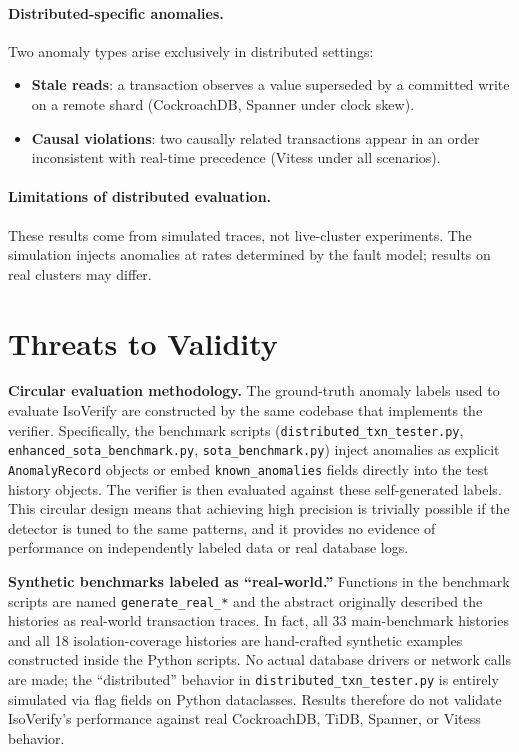 \documentclass[11pt]{article}
\begin{document}
\paragraph{Distributed-specific anomalies.}
Two anomaly types arise exclusively in distributed settings:
\begin{itemize}[nosep]
  \item \textbf{Stale reads}: a transaction observes a value superseded by a
    committed write on a remote shard (CockroachDB, Spanner under clock skew).
  \item \textbf{Causal violations}: two causally related transactions appear
    in an order inconsistent with real-time precedence (Vitess under all
    scenarios).
\end{itemize}

\paragraph{Limitations of distributed evaluation.}
These results come from simulated traces, not live-cluster experiments.  The
simulation injects anomalies at rates determined by the fault model; results
on real clusters may differ.

\section{Threats to Validity}
\label{sec:threats}

\textbf{Circular evaluation methodology.}
The ground-truth anomaly labels used to evaluate IsoVerify are constructed
by the same codebase that implements the verifier.  Specifically, the
benchmark scripts (\texttt{distributed\_txn\_tester.py},
\texttt{enhanced\_sota\_benchmark.py}, \texttt{sota\_benchmark.py}) inject
anomalies as explicit \texttt{AnomalyRecord} objects or embed
\texttt{known\_anomalies} fields directly into the test history objects.
The verifier is then evaluated against these self-generated labels.
This circular design means that achieving high precision is trivially
possible if the detector is tuned to the same patterns, and it provides
no evidence of performance on independently labeled data or real
database logs.

\textbf{Synthetic benchmarks labeled as ``real-world.''}
Functions in the benchmark scripts are named \texttt{generate\_real\_*}
and the abstract originally described the histories as real-world
transaction traces.  In fact, all 33 main-benchmark histories and all
18 isolation-coverage histories are hand-crafted synthetic examples
constructed inside the Python scripts.  No actual database drivers or
network calls are made; the ``distributed'' behavior in
\texttt{distributed\_txn\_tester.py} is entirely simulated via flag
fields on Python dataclasses.  Results therefore do not validate
IsoVerify's performance against real CockroachDB, TiDB, Spanner, or
Vitess behavior.
\end{document}
